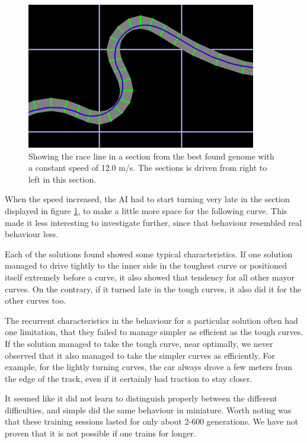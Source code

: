 \begin{figure}[h]
\includegraphics[width=\textwidth]{report/images/constant_speed_section}
\centering
\caption{Showing the race line in a section from the best found genome with a constant speed of 12.0 m/s. The sections is driven from right to left in this section.}
\label{fig:constantspeedsection}
\end{figure}

When the speed increased, the AI had to start turning very late in the section displayed in figure  \ref{fig:constantspeedsection}, to make a little more space for the following curve. This made it less interesting to investigate further, since that behaviour resembled real behaviour less.



Each of the solutions found showed some typical characteristics. If one solution managed to drive tightly to the inner side in the toughest curve or positioned itself extremely before a curve, it also showed that tendency for all other mayor curves. On the contrary, if it turned late in the tough curves, it also did it for the other curves too.

The recurrent characteristics in the behaviour for a particular solution often had one limitation, that they failed to manage simpler as efficient as the tough curves. If the solution managed to take the tough curve, near optimally, we never observed that it also managed to take the simpler curves as efficiently. For example, for the lightly turning curves, the car always drove a few meters from the edge of the track, even if it certainly had traction to stay closer. 

It seemed like it did not learn to distinguish properly between the different difficulties, and simple did the same behaviour in miniature. Worth noting was that these training sessions lasted for only about 2-600 generations. We have not proven that it is not possible if one trains for longer.

